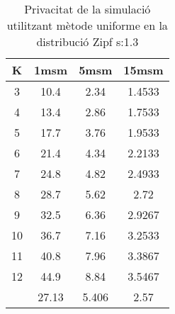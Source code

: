 \begin{table}[H]
\centering
\begin{tabular}{c|ccc}
K &1msm &5msm &15msm\\
\hline
3 & 10.4 & 2.34 & 1.4533\\
4 & 13.4 & 2.86 & 1.7533\\
5 & 17.7 & 3.76 & 1.9533\\
6 & 21.4 & 4.34 & 2.2133\\
7 & 24.8 & 4.82 & 2.4933\\
8 & 28.7 & 5.62 & 2.72\\
9 & 32.5 & 6.36 & 2.9267\\
10 & 36.7 & 7.16 & 3.2533\\
11 & 40.8 & 7.96 & 3.3867\\
12 & 44.9 & 8.84 & 3.5467\\
\hline
& 27.13 & 5.406 & 2.57\\
\end{tabular}
\caption{Privacitat de la simulació utilitzant mètode uniforme en la distribució Zipf s:1.3}
\label{tab:u13}
\end{table}
